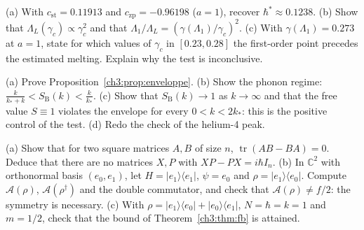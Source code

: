 \begin{exercise}\label{ch3:ex:lind}
(a) With $c_{\mathrm{st}}=0.11913$ and $c_{\mathrm{zp}}=-0.96198$ ($a=1$), recover $\hbar^*\approx0.1238$.
(b) Show that $\Lambda_L(\gamma_c)\propto\gamma_c^2$ and that $\Lambda_1/\Lambda_L=(\gamma(\Lambda_1)/\gamma_c)^2$.
(c) With $\gamma(\Lambda_1)=0.273$ at $a=1$, state for which values of $\gamma_c$ in $[0.23, 0.28]$ the first-order
point precedes the estimated melting. Explain why the test is inconclusive.
\end{exercise}

\begin{exercise}\label{ch3:ex:bog}
(a) Prove Proposition~\ref{ch3:prop:enveloppe}. (b) Show the phonon regime:
$\frac{k}{k_*+k}<S_{\mathrm B}(k)<\frac{k}{k_*}$. (c) Show that $S_{\mathrm B}(k)\to1$ as $k\to\infty$ and that the free
value $S\equiv1$ violates the envelope for every $0<k<2k_*$: this is the positive control of the test. (d) Redo the
check of the helium-4 peak.
\end{exercise}

\begin{exercise}\label{ch3:ex:trace}
(a) Show that for two square matrices $A,B$ of size $n$, $\operatorname{tr}(AB-BA)=0$. Deduce that there are
no matrices $X,P$ with $XP-PX=i\hbar I_n$. (b) In $\mathbb{C}^2$ with orthonormal basis $(e_0,e_1)$, let
$H=|e_1\rangle\langle e_1|$, $\psi=e_0$ and $\rho=|e_1\rangle\langle e_0|$. Compute $\mathcal A(\rho)$,
$\mathcal A(\rho^\dagger)$ and the double commutator, and check that $\mathcal A(\rho)\ne f/2$: the symmetry is
necessary. (c) With $\rho=|e_1\rangle\langle e_0|+|e_0\rangle\langle e_1|$, $N=\hbar=k=1$ and $m=1/2$, check that the
bound of Theorem~\ref{ch3:thm:fb} is attained.
\end{exercise}


